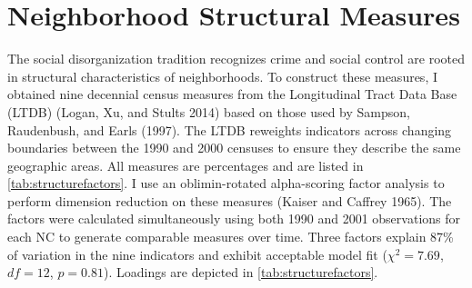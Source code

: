 \documentclass [11pt, proquest] {uwthesis}[2015/03/03]
\begin{document}
\hypertarget{neighborhood-structural-measures}{%
\section{Neighborhood Structural Measures}\label{neighborhood-structural-measures}}

The social disorganization tradition recognizes crime and social control are rooted in structural characteristics of neighborhoods. To construct these measures, I obtained nine decennial census measures from the Longitudinal Tract Data Base (LTDB) (Logan, Xu, and Stults 2014) based on those used by Sampson, Raudenbush, and Earls (1997). The LTDB reweights indicators across changing boundaries between the 1990 and 2000 censuses to ensure they describe the same geographic areas. All measures are percentages and are listed in \ref{tab:structurefactors}. I use an oblimin-rotated alpha-scoring factor analysis to perform dimension reduction on these measures (Kaiser and Caffrey 1965). The factors were calculated simultaneously using both 1990 and 2001 observations for each NC to generate comparable measures over time. Three factors explain 87\% of variation in the nine indicators and exhibit acceptable model fit (\(\chi^{2}=7.69\), \(df = 12\), \(p=0.81\)). Loadings are depicted in \ref{tab:structurefactors}.

\providecommand{\docline}[3]{\noalign{\global\setlength{\arrayrulewidth}{#1}}\arrayrulecolor[HTML]{#2}\cline{#3}}

\setlength{\tabcolsep}{4pt}
\end{document}
